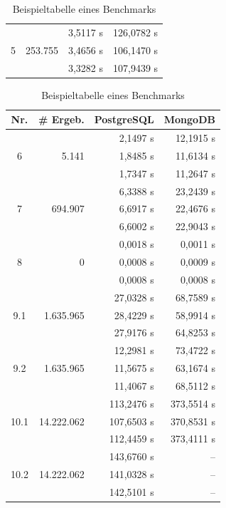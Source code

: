 \begin{table}[hb]
\begin{minipage}{0.49\linewidth}
\begin{tabular}{||c | r | r | r |}
    \hline
    \multirow{3}{*}{5} & \multirow{3}{*}{253.755}
      & 3,5117 s & 126,0782 s \\
    & & 3,4656 s & 106,1470 s \\
    & & 3,3282 s & 107,9439 s \\
    \hline
\end{tabular}
\end{minipage}
%
\begin{minipage}{0.49\linewidth}
\centering
\begin{tabular}{|c | r | r | r ||} 
    \hline
    \textbf{Nr.} & \textbf{\# Ergeb.} & \textbf{PostgreSQL} & \textbf{MongoDB} \\ [0.5ex] 
    \hline\hline 
    \multirow{3}{*}{6} & \multirow{3}{*}{5.141}
      & 2,1497 s & 12,1915 s \\
    & & 1,8485 s & 11,6134 s \\
    & & 1,7347 s & 11,2647 s \\
    \hline
    \multirow{3}{*}{7} & \multirow{3}{*}{694.907} 
      & 6,3388 s & 23,2439 s \\
    & & 6,6917 s & 22,4676 s \\
    & & 6,6002 s & 22,9043 s \\
    \hline
    \multirow{3}{*}{8} & \multirow{3}{*}{0} 
      & 0,0018 s & 0,0011 s \\
    & & 0,0008 s & 0,0009 s \\
    & & 0,0008 s & 0,0008 s \\
    \hline
    \multirow{3}{*}{9.1} & \multirow{3}{*}{1.635.965} 
      & 27,0328 s & 68,7589 s \\
    & & 28,4229 s & 58,9914 s \\
    & & 27,9176 s & 64,8253 s \\
    \hline
    \multirow{3}{*}{9.2} & \multirow{3}{*}{1.635.965} 
      & 12,2981 s & 73,4722 s \\
    & & 11,5675 s & 63,1674 s \\
    & & 11,4067 s & 68,5112 s \\
    \hline
    \multirow{3}{*}{10.1} & \multirow{3}{*}{14.222.062} 
      & 113,2476 s & 373,5514 s \\
    & & 107,6503 s & 370,8531 s \\
    & & 112,4459 s & 373,4111 s \\
    \hline
    \multirow{3}{*}{10.2} & \multirow{3}{*}{14.222.062} 
      & 143,6760 s & -- \\
    & & 141,0328 s & -- \\
    & & 142,5101 s & -- \\
    \hline
\end{tabular}
\end{minipage}
\caption{Beispieltabelle eines Benchmarks}
\label{tab:benchmark_results}
\end{table}
